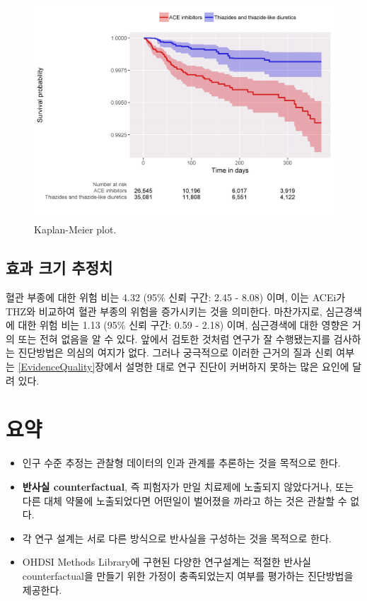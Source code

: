 \documentclass[11pt]{book}
\theoremstyle{definition}
\theoremstyle{definition}
\theoremstyle{definition}
\theoremstyle{remark}
\let\BeginKnitrBlock\begin \let\EndKnitrBlock\end
\begin{document}
\begin{figure}

{\centering \includegraphics[width=1\linewidth]{images/PopulationLevelEstimation/kmPlot} 

}

\caption{Kaplan-Meier plot.}\label{fig:kmPlot}
\end{figure}

\subsection{효과 크기 추정치}\label{--}

혈관 부종에 대한 위험 비는 4.32 (95\% 신뢰 구간: 2.45 - 8.08) 이며, 이는
ACEi가 THZ와 비교하여 혈관 부종의 위험을 증가시키는 것을 의미한다.
마찬가지로, 심근경색에 대한 위험 비는 1.13 (95\% 신뢰 구간: 0.59 - 2.18)
이며, 심근경색에 대한 영향은 거의 또는 전혀 없음을 알 수 있다. 앞에서
검토한 것처럼 연구가 잘 수행됐는지를 검사하는 진단방법은 의심의 여지가
없다. 그러나 궁극적으로 이러한 근거의 질과 신뢰 여부는
\ref{EvidenceQuality}장에서 설명한 대로 연구 진단이 커버하지 못하는 많은
요인에 달려 있다.

\section{요약}\label{-10}

\BeginKnitrBlock{rmdsummary}
\begin{itemize}
\item
  인구 수준 추정는 관찰형 데이터의 인과 관계를 추론하는 것을 목적으로
  한다.
\item
  \textbf{반사실 counterfactual}, 즉 피험자가 만일 치료제에 노출되지
  않았다거나, 또는 다른 대체 약물에 노출되었다면 어떤일이 벌어졌을
  까라고 하는 것은 관찰할 수 없다.
\item
  각 연구 설계는 서로 다른 방식으로 반사실을 구성하는 것을 목적으로
  한다.
\item
  OHDSI Methods Library에 구현된 다양한 연구설계는 적절한 반사실
  counterfactual을 만들기 위한 가정이 충족되었는지 여부를 평가하는
  진단방법을 제공한다.
\end{itemize}
\EndKnitrBlock{rmdsummary}
\end{document}
